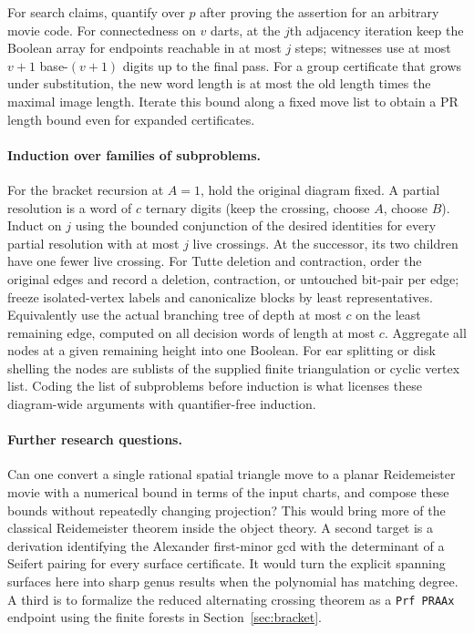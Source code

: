 For search claims, quantify over $p$ after proving the assertion for an arbitrary movie code. For connectedness on $v$ darts, at the $j$th adjacency iteration keep the Boolean array for endpoints reachable in at most $j$ steps; witnesses use at most $v+1$ base-$(v+1)$ digits up to the final pass. For a group certificate that grows under substitution, the new word length is at most the old length times the maximal image length. Iterate this bound along a fixed move list to obtain a PR length bound even for expanded certificates.

\paragraph{Induction over families of subproblems.}
For the bracket recursion at $A=1$, hold the original diagram fixed. A partial resolution is a word of $c$ ternary digits (keep the crossing, choose $A$, choose $B$). Induct on $j$ using the bounded conjunction of the desired identities for every partial resolution with at most $j$ live crossings. At the successor, its two children have one fewer live crossing. For Tutte deletion and contraction, order the original edges and record a deletion, contraction, or untouched bit-pair per edge; freeze isolated-vertex labels and canonicalize blocks by least representatives. Equivalently use the actual branching tree of depth at most $c$ on the least remaining edge, computed on all decision words of length at most $c$. Aggregate all nodes at a given remaining height into one Boolean. For ear splitting or disk shelling the nodes are sublists of the supplied finite triangulation or cyclic vertex list. Coding the list of subproblems before induction is what licenses these diagram-wide arguments with quantifier-free induction.

\paragraph{Further research questions.}
Can one convert a single rational spatial triangle move to a planar Reidemeister movie with a numerical bound in terms of the input charts, and compose these bounds without repeatedly changing projection? This would bring more of the classical Reidemeister theorem inside the object theory. A second target is a derivation identifying the Alexander first-minor gcd with the determinant of a Seifert pairing for every surface certificate. It would turn the explicit spanning surfaces here into sharp genus results when the polynomial has matching degree. A third is to formalize the reduced alternating crossing theorem as a \texttt{Prf PRAAx} endpoint using the finite forests in Section~\ref{sec:bracket}.

